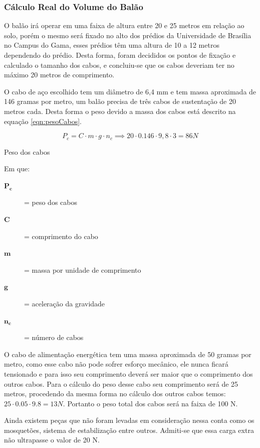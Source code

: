 \subsubsection{Cálculo Real do Volume do Balão}

O  balão irá operar em uma faixa de altura entre 20 e 25 metros em relação ao solo, porém  o mesmo será fixado no alto dos prédios da Universidade de Brasília no Campus do Gama, esses prédios têm uma altura de 10 a 12 metros dependendo do prédio. Desta forma, foram decididos os pontos de fixação e calculado o tamanho dos cabos, e concluiu-se que os cabos deveriam ter no máximo 20 metros de comprimento.

O cabo de aço escolhido tem um diâmetro de 6,4 mm e tem massa aproximada de 146 gramas por metro, um balão precisa de três cabos de sustentação de 20 metros cada. Desta forma o peso devido a massa dos cabos está descrito na equação \eqref{eqn:pesoCabos}.

\begin{equacao}
	\begin{equation}
		P_{c} = C \cdot m \cdot g \cdot n_{c} \implies 20 \cdot 0.146 \cdot 9,8 \cdot 3 = 86 N
	\end{equation}
	\caption{Peso dos cabos}
	\label{eqn:pesoCabos}
\end{equacao}

Em que:
\begin{description}
	\item[$\boldsymbol{P_{c}}$] = peso dos cabos
	\item[$\boldsymbol{C}$] = comprimento do cabo
	\item[$\boldsymbol{m}$] = massa por unidade de comprimento
	\item[$\boldsymbol{g}$] = aceleração da gravidade
	\item[$\boldsymbol{n_{c}}$] = número de cabos
\end{description}

O cabo de alimentação energética tem uma massa aproximada de 50 gramas por metro, como esse cabo não pode sofrer esforço mecânico, ele nunca  ficará tensionado e para isso seu comprimento deverá ser maior que o comprimento dos outros cabos. Para o cálculo do peso desse cabo seu comprimento será de 25 metros, procedendo da mesma forma no cálculo dos outros cabos temos: $25 \cdot 0.05 \cdot 9.8 = 13 N$. Portanto o peso total dos cabos será na faixa de 100 N.

Ainda existem peças que não foram levadas em consideração nessa conta como os mosquetões, sistema de estabilização entre outros. Admiti-se que essa carga extra não ultrapasse o valor de 20 N.

